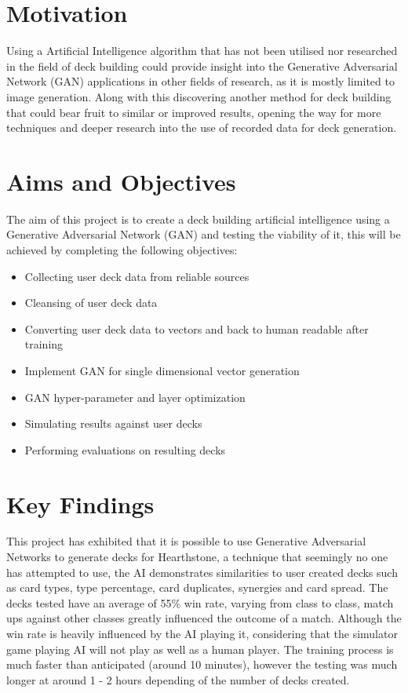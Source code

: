 \documentclass{report} %
\begin{document}
\section{Motivation}
Using a Artificial Intelligence algorithm that has not been utilised nor researched in the field of deck building could provide insight into the Generative Adversarial Network (GAN) applications in other fields of research, as it is mostly limited to image generation. Along with this discovering another method for deck building that could bear fruit to similar or improved results, opening the way for more techniques and deeper research into the use of recorded data for deck generation. 
\section{Aims and Objectives}
The aim of this project is to create a deck building artificial intelligence using a Generative Adversarial Network (GAN) and testing the viability of it, this will be achieved by completing the following objectives:
\begin{itemize}
  \item Collecting user deck data from reliable sources
  \item Cleansing of user deck data
  \item Converting user deck data to vectors and back to human readable after training
  \item Implement GAN for single dimensional vector generation
  \item GAN hyper-parameter and layer optimization
  \item Simulating results against user decks
  \item Performing evaluations on resulting decks
\end{itemize}
\section{Key Findings}
This project has exhibited that it is possible to use Generative Adversarial Networks to generate decks for Hearthstone, a technique that seemingly no one has attempted to use, the AI demonstrates similarities to user created decks such as card types, type percentage, card duplicates, synergies and card spread. The decks tested have an average of 55\% win rate, varying from class to class, match ups against other classes greatly influenced the outcome of a match. Although the win rate is heavily influenced by the AI playing it, considering that the simulator game playing AI will not play as well as a human player. The training process is much faster than anticipated (around 10 minutes), however the testing was much longer at around 1 - 2 hours depending of the number of decks created.
\end{document}
